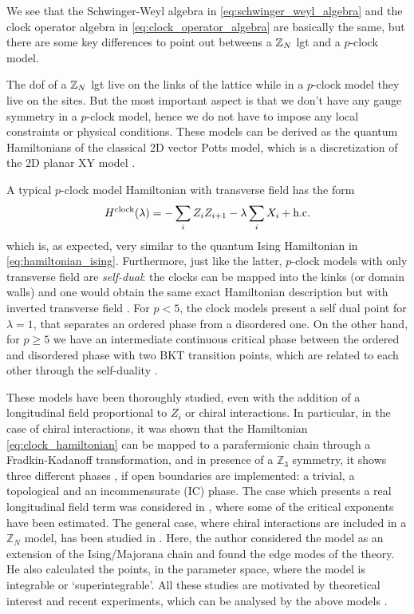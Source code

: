 We see that the Schwinger-Weyl algebra in \eqref{eq:schwinger_weyl_algebra} and the clock operator algebra in \eqref{eq:clock_operator_algebra} are basically the same, but there are some key differences to point out betweens a $\mathbb{Z}_N$ \ac{lgt} and a $p$-clock model.

The \ac{dof} of a $\mathbb{Z}_N$ \ac{lgt} live on the links of the lattice while in a $p$-clock model they live on the sites.
But the most important aspect is that we don't have any gauge symmetry in a $p$-clock model, hence we do not have to impose any local constraints or physical conditions.
These models can be derived as the quantum Hamiltonians of the classical 2D vector Potts model, which is a discretization of the 2D planar XY model \cite{ortiz2012dualities}.

A typical $p$-clock model Hamiltonian with transverse field has the form
\begin{equation}
    H^{\text{clock}}(\lambda) = - \sum_{i} Z_i Z_{i+1} - \lambda \sum_{i} X_i + \text{h.c.}
    \label{eq:clock_hamiltonian}
\end{equation}
which is, as expected, very similar to the quantum Ising Hamiltonian in \eqref{eq:hamiltonian_ising}.
Furthermore, just like the latter, $p$-clock models with only transverse field are \emph{self-dual}:
the clocks can be mapped into the kinks (or domain walls) and one would obtain the same exact Hamiltonian description but with inverted transverse field \cite{ortiz2012dualities}.
For $p < 5$, the clock models present a self dual point for $\lambda = 1$, that separates an ordered phase from a disordered one.
On the other hand, for $p \geq 5$ we have an intermediate continuous critical phase between the ordered and disordered phase with two BKT transition points, which are related to each other through the self-duality \cite{sun2019phase}.

These models have been thoroughly studied, even with the addition of a longitudinal field proportional to $Z_i$ \cite{baxter1982exactlysm} or chiral interactions.
In particular, in the case of chiral interactions, it was shown \cite{fendley2012parafermions} that the Hamiltonian \eqref{eq:clock_hamiltonian} can be mapped to a parafermionic chain through a Fradkin-Kadanoff transformation, and in presence of a $\mathbb{Z}_3$ symmetry, it shows three different phases \cite{zhuang2015clock}, if open boundaries are implemented: a trivial, a topological and an incommensurate (IC) phase.
The case which presents a real longitudinal field term was considered in \cite{huang2019clock},  where some of the critical exponents have been estimated.
The general case, where chiral interactions are included in a $\mathbb{Z}_N$ model, has been studied in \cite{fendley2012parafermions}.
Here, the author considered the model as an extension of the Ising/Majorana chain and found the edge modes of the theory.
He also calculated the points, in the parameter space, where the model is integrable or `superintegrable'.
All these studies are motivated by theoretical interest and recent experiments, which can be analysed by the above models \cite{bernien2017probing}.


